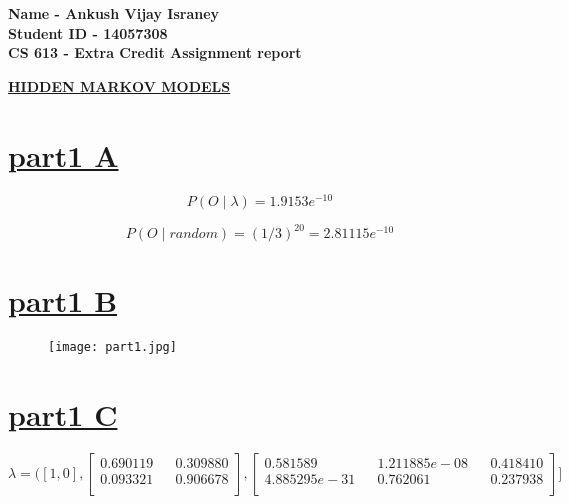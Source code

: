 \documentclass{report}
\begin{document}
 

\begin{flushleft}

\begin{Large}

\textbf{Name - Ankush Vijay Israney} \\
\textbf{Student ID - 14057308} \\
\textbf{CS 613 - Extra Credit Assignment report} \\ 

\end{Large} 

\break

\underline { \textbf{HIDDEN MARKOV MODELS}}
\section{\underline{part1 A}} 

 \begin{equation}
 P(O \mid \lambda) = 1.9153e^{-10} 
 \end{equation}
 
 \begin{equation}
 P(O \mid random) = (1/3)^{20} = 2.81115e^{-10} 
 \end{equation}
 
 \break

\section{\underline{part1 B}}

\begin{figure}[ht!]
\texttt{[image: part1.jpg]}
\end{figure} 

\break

\section{\underline{part1 C}}

\[
\lambda = ([1 , 0], \begin{bmatrix}
0.690119 &&	0.309880 \\
0.093321	&& 0.906678 \\
\end{bmatrix}
,  \begin{bmatrix}
0.581589 && 1.211885e-08	&& 0.418410 \\
4.885295e-31	&& 0.762061   &&	0.237938 \\
\end{bmatrix}]
\]




\end{flushleft} 
\end{document}
